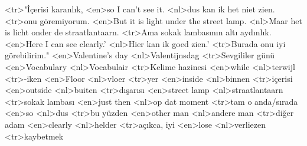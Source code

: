 <tr>"İçerisi karanlık,
<en>so I can’t see it.
<nl>dus kan ik het niet zien.
<tr>onu göremiyorum.
<en>But it is light under the street lamp.
<nl>Maar het is licht onder de straatlantaarn.
<tr>Ama sokak lambasının altı aydınlık.
<en>Here I can see clearly.'
<nl>Hier  kan ik goed zien.'
<tr>Burada onu iyi görebilirim."
<en>Valentine's day
<nl>Valentijnsdag 
<tr>Sevgililer günü
<en>Vocabulary
<nl>Vocabulair
<tr>Kelime hazinesi
<en>while
<nl>terwijl
<tr>-iken
<en>Floor
<nl>vloer
<tr>yer
<en>inside
<nl>binnen 
<tr>içerisi
<en>outside
<nl>buiten
<tr>dışarısı
<en>street lamp
<nl>straatlantaarn
<tr>sokak lambası
<en>just then
<nl>op dat moment
<tr>tam o anda/sırada
<en>so
<nl>dus
<tr>bu yüzden
<en>other man
<nl>andere man
<tr>diğer adam
<en>clearly
<nl>helder
<tr>açıkca, iyi
<en>lose
<nl>verliezen
<tr>kaybetmek
